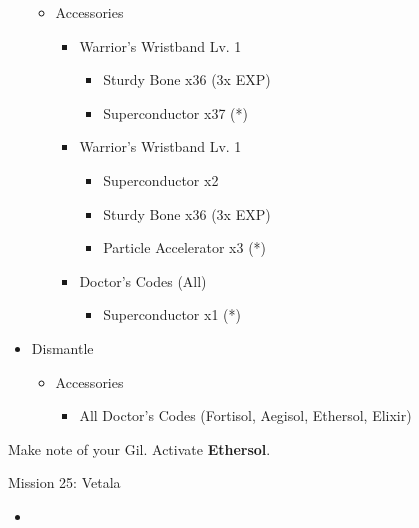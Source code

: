 \begin{multicols}{2}
\begin{upgrade}
\begin{itemize}
\begin{itemize}
\begin{itemize}
				            \end{itemize}
				      \item Accessories
				            \begin{itemize}
					            \item Warrior's Wristband Lv. 1
					                  \begin{itemize}
						                  \item Sturdy Bone x36 (3x EXP)
						                  \item Superconductor x37 (*)
					                  \end{itemize}
					            \item Warrior's Wristband Lv. 1
					                  \begin{itemize}
						                  \item Superconductor x2
						                  \item Sturdy Bone x36 (3x EXP)
						                  \item Particle Accelerator x3 (*)
					                  \end{itemize}
					            \item Doctor's Codes (All)
					                  \begin{itemize}
						                  \item Superconductor x1 (*)
					                  \end{itemize}
				            \end{itemize}
			      \end{itemize}
			\item Dismantle
			      \begin{itemize}
				      \item Accessories
				            \begin{itemize}
					            \item All Doctor's Codes (Fortisol, Aegisol, Ethersol, Elixir)
				            \end{itemize}
			      \end{itemize}
		\end{itemize}
	\end{upgrade}
	Make note of your Gil.
	\newpage
	Activate \textbf{Ethersol}.
	\renewcommand{\fifth}{[5] Smart Bomb (\rav/\sab/\rav)}
	\begin{battle}[0:38]{Mission 25: Vetala}
		\begin{itemize}
			\item \first
			      \begin{itemize}

\end{itemize}
\end{itemize}
\end{battle}
\end{multicols}
